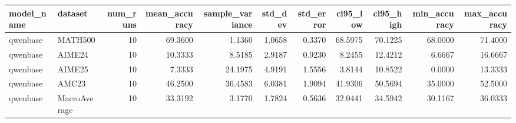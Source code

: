 \begin{tabular}{llrrrrrrrrr}
\toprule
model_name & dataset & num_runs & mean_accuracy & sample_variance & std_dev & std_error & ci95_low & ci95_high & min_accuracy & max_accuracy \\
\midrule
qwenbase & MATH500 & 10 & 69.3600 & 1.1360 & 1.0658 & 0.3370 & 68.5975 & 70.1225 & 68.0000 & 71.4000 \\
qwenbase & AIME24 & 10 & 10.3333 & 8.5185 & 2.9187 & 0.9230 & 8.2455 & 12.4212 & 6.6667 & 16.6667 \\
qwenbase & AIME25 & 10 & 7.3333 & 24.1975 & 4.9191 & 1.5556 & 3.8144 & 10.8522 & 0.0000 & 13.3333 \\
qwenbase & AMC23 & 10 & 46.2500 & 36.4583 & 6.0381 & 1.9094 & 41.9306 & 50.5694 & 35.0000 & 52.5000 \\
qwenbase & MacroAverage & 10 & 33.3192 & 3.1770 & 1.7824 & 0.5636 & 32.0441 & 34.5942 & 30.1167 & 36.0333 \\
\bottomrule
\end{tabular}
